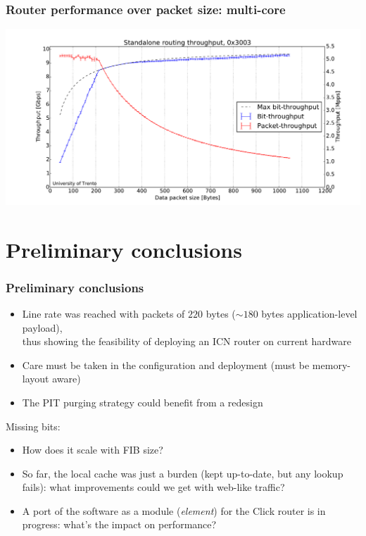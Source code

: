 \begin{frame}[fragile]
  \frametitle{Router performance over packet size: multi-core}
  
  \includegraphics[width=\textwidth]{img/augustus_increasing_len_0x3003.pdf}
\end{frame}

\section{Preliminary conclusions}
\begin{frame}[fragile]
  \frametitle{Preliminary conclusions}
  \begin{itemize}
    \item Line rate was reached with packets of $220$ bytes ($\sim180$ bytes application-level payload),\\
      thus showing the feasibility of deploying an ICN router on current hardware
    \item Care must be taken in the configuration and deployment (must be memory-layout aware)
    \item The PIT purging strategy could benefit from a redesign
  \end{itemize}

  \onslide<+->
  \onslide<+->
  Missing bits:

  \begin{itemize}
    \item<+-> How does it scale with FIB size?
    \item<+-> So far, the local cache was just a burden (kept up-to-date, but any lookup fails): what improvements could we get with web-like traffic?
    \item<+-> A port of the software as a module (\textit{element}) for the Click router is in progress: what's the impact on performance?
  \end{itemize}
\end{frame}


